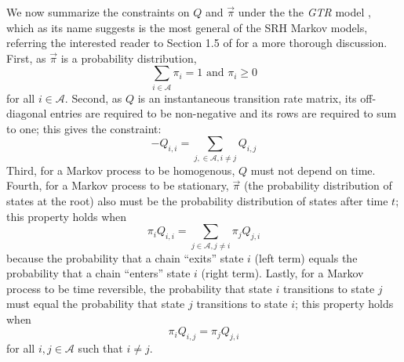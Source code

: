 We now summarize the constraints on $Q$ and $\vec{\pi}$ under the the \textit{\gls{GTR}} model \cite{tavare1986some}, which as its name suggests is the most general of the SRH Markov models, referring the interested reader to Section 1.5 of \cite{yang2006computational} for a more thorough discussion.
First, as $\vec{\pi}$ is a probability distribution,
\begin{equation}
	\label{eq:pi}
	\sum_{i \in \mathcal{A}} \pi_i = 1 \text{ and } \pi_i \ge 0
\end{equation}
for all $i \in \mathcal{A}$. 
Second, as $Q$ is an instantaneous transition rate matrix, its off-diagonal entries are required to be non-negative and its rows are required to sum to one; this gives the constraint:
\begin{equation}
	\label{eq:chainout}
	-Q_{i,i} = \sum_{j, \in \mathcal{A}, i \ne j} Q_{i,j}
\end{equation}
Third, for a Markov process to be homogenous, $Q$ must not depend on time.
Fourth, for a Markov process to be stationary, $\vec{\pi}$ (the probability distribution of states at the root) also must be the probability distribution of states after time $t$; this property holds when
\begin{equation}
	\label{eq:stationary}
	\pi_i Q_{i,i} = \sum_{j \in \mathcal{A}, j \ne i} \pi_j Q_{j,i}
\end{equation}
because the probability that a chain ``exits'' state $i$ (left term) equals the probability that a chain ``enters'' state $i$ (right term).
Lastly, for a Markov process to be time reversible, the probability that state $i$ transitions to state $j$ must equal the probability that state $j$ transitions to state $i$; this property holds when
\begin{equation}
	\label{eq:reversible}
	\pi_i Q_{i,j}  = \pi_j Q_{j,i}
\end{equation}
for all $i, j \in \mathcal{A}$ such that $i \ne j$.

